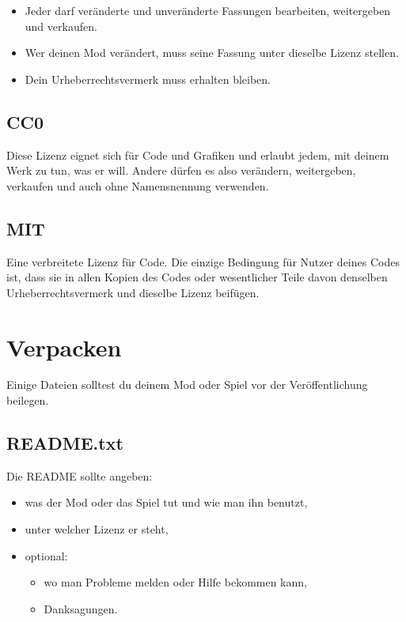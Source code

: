 \begin{itemize}
\tightlist
\item
  Jeder darf veränderte und unveränderte Fassungen bearbeiten,
  weitergeben und verkaufen.
\item
  Wer deinen Mod verändert, muss seine Fassung unter dieselbe Lizenz
  stellen.
\item
  Dein Urheberrechtsvermerk muss erhalten bleiben.
\end{itemize}

\subsection{CC0}\label{cc0}

Diese Lizenz eignet sich für Code und Grafiken und erlaubt jedem, mit
deinem Werk zu tun, was er will. Andere dürfen es also verändern,
weitergeben, verkaufen und auch ohne Namensnennung verwenden.

\subsection{MIT}\label{mit}

Eine verbreitete Lizenz für Code. Die einzige Bedingung für Nutzer
deines Codes ist, dass sie in allen Kopien des Codes oder wesentlicher
Teile davon denselben Urheberrechtsvermerk und dieselbe Lizenz beifügen.

\section{Verpacken}\label{verpacken}

Einige Dateien solltest du deinem Mod oder Spiel vor der
Veröffentlichung beilegen.

\subsection{README.txt}\label{readme.txt}

Die README sollte angeben:

\begin{itemize}
\tightlist
\item
  was der Mod oder das Spiel tut und wie man ihn benutzt,
\item
  unter welcher Lizenz er steht,
\item
  optional:

  \begin{itemize}
  \tightlist
  \item
    wo man Probleme melden oder Hilfe bekommen kann,
  \item
    Danksagungen.
  \end{itemize}
\end{itemize}

